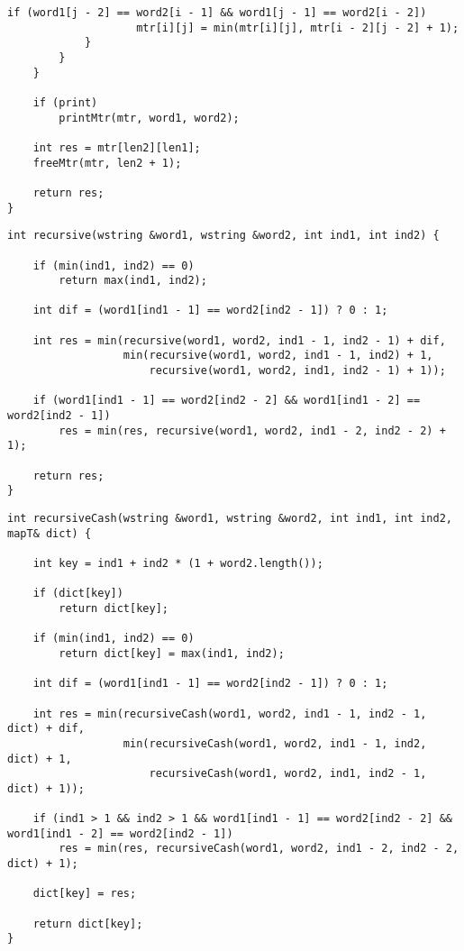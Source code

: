 \begin{lstlisting}[label=lst:dameray_lev_rec,caption=Функция нахождения расстояния Дамерау-Левенштейна с использованием матрицы (окончание)]
                if (word1[j - 2] == word2[i - 1] && word1[j - 1] == word2[i - 2]) 
                    mtr[i][j] = min(mtr[i][j], mtr[i - 2][j - 2] + 1);
            }
        }
    }

    if (print)  
        printMtr(mtr, word1, word2);

    int res = mtr[len2][len1];
    freeMtr(mtr, len2 + 1);

    return res;
}
\end{lstlisting}

\clearpage

\begin{lstlisting}[label=lst:dameray_lev_mtr,caption=Функция нахождения расстояния Дамерау-Левенштейна рекурсивно]
int recursive(wstring &word1, wstring &word2, int ind1, int ind2) {

    if (min(ind1, ind2) == 0)
        return max(ind1, ind2);

    int dif = (word1[ind1 - 1] == word2[ind2 - 1]) ? 0 : 1;

    int res = min(recursive(word1, word2, ind1 - 1, ind2 - 1) + dif,
                  min(recursive(word1, word2, ind1 - 1, ind2) + 1, 
                      recursive(word1, word2, ind1, ind2 - 1) + 1));
                      
    if (word1[ind1 - 1] == word2[ind2 - 2] && word1[ind1 - 2] == word2[ind2 - 1])
        res = min(res, recursive(word1, word2, ind1 - 2, ind2 - 2) + 1);

    return res;
}
\end{lstlisting}

\clearpage

\begin{lstlisting}[label=lst:dameray_lev_rec_hash,caption=Функция нахождения расстояния Дамерау-Левенштейна рекурсивно c кешированием]
int recursiveCash(wstring &word1, wstring &word2, int ind1, int ind2, mapT& dict) {

    int key = ind1 + ind2 * (1 + word2.length());

    if (dict[key])
        return dict[key];

    if (min(ind1, ind2) == 0)
        return dict[key] = max(ind1, ind2);

    int dif = (word1[ind1 - 1] == word2[ind2 - 1]) ? 0 : 1;

    int res = min(recursiveCash(word1, word2, ind1 - 1, ind2 - 1, dict) + dif,
                  min(recursiveCash(word1, word2, ind1 - 1, ind2, dict) + 1, 
                      recursiveCash(word1, word2, ind1, ind2 - 1, dict) + 1));

    if (ind1 > 1 && ind2 > 1 && word1[ind1 - 1] == word2[ind2 - 2] && word1[ind1 - 2] == word2[ind2 - 1])
        res = min(res, recursiveCash(word1, word2, ind1 - 2, ind2 - 2, dict) + 1);

    dict[key] = res;

    return dict[key];
}
\end{lstlisting}

